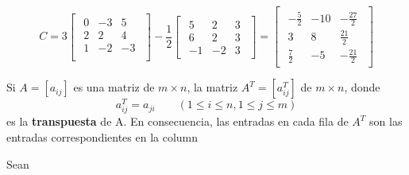 \documentclass{article}
\begin{document}
\begin{equation*}
    C= 3 \begin{bmatrix}
        \begin{array}{rrr}
            0 &-3 & 5\\
            2 & 2 & 4\\
            1 &-2 &-3\\
        \end{array}
    \end{bmatrix}
    -\frac{1}{2}\begin{bmatrix}
        \begin{array}{rrr}
            5 & 2 & 3\\
            6 & 2 & 3\\
            -1& -2& 3  
        \end{array}
    \end{bmatrix}
    = \begin{bmatrix}
        \begin{array}{rrr}
            -\frac{5}{2} & -10  & -\frac{27}{2} \\
            3 & 8 & \frac{21}{2} \\
            \frac{7}{2} & -5 & -\frac{21}{2}  
        \end{array}
    \end{bmatrix}
\end{equation*}

\begin{tcolorbox}[colback=blue!10!white,colframe=blue!60!black,title=Transpuesta de una Matriz]
    Si $A = [a_{ij}]$ es una matriz de $m \times n$, la matriz $A^{T} = \left[a_{ij}^{T}\right]$ de $m \times n$, donde $$a_{ij}^{T} = a_{ji} \quad\quad (1\leq i \leq n, 1 \leq j \leq m)$$ es la \textbf{transpuesta} de A. En consecuencia, las entradas en cada fila de $A^T$ son las entradas correspondientes en la column
\end{tcolorbox}

Sean
\end{document}
